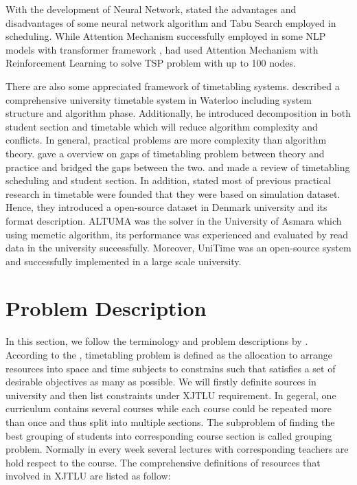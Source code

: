 \documentclass{article}
\begin{document}
With the development of Neural Network, \cite{(fazelzarandi2020)state} stated the advantages and disadvantages of some neural network algorithm and Tabu Search employed in scheduling. While Attention Mechanism successfully employed in some NLP models with transformer framework \citep{(ashishvaswani2017)attention,(devlin2019)bert}, \cite{(kool2019)attention} had used Attention Mechanism with Reinforcement Learning to solve TSP problem with up to 100 nodes.

There are also some appreciated framework of timetabling systems. \cite{(carter2000)comprehensive} described a comprehensive university timetable system in Waterloo including system structure and algorithm phase. Additionally, he introduced decomposition in both student section and timetable which will reduce algorithm complexity and conflicts. In general, practical problems are more complexity than algorithm theory. \cite{(mccollum2006)perspective} gave a overview on gaps of timetabling problem between theory and practice and bridged the gaps between the two.  \cite{(kristiansen2013)comprehensive} and \cite{(johnes2015)operational} made a review of timetabling scheduling and student section. In addition, \cite{(kristiansen2013)comprehensive} stated most of previous practical research in timetable were founded that they were based on simulation dataset. Hence, they introduced a open-source dataset in Denmark university and its format description. ALTUMA \citep{(tesfaldet2008)automated} was the solver in the University of Asmara which using memetic algorithm, its performance was experienced and evaluated by read data in the university successfully. Moreover, UniTime \citep{(muller2016)reallife} was an open-source system and successfully implemented in a large scale university.


\newpage

\section{Problem Description}
\label{sec: Problem Description}

In this section, we follow the terminology and problem descriptions by \cite{(werra1985)introduction}. According to the \cite{(wren1996)scheduling}, timetabling problem is defined as the allocation to arrange resources into space and time subjects to constrains such that satisfies a set of desirable objectives as many as possible. We will firstly definite sources in university and then list constraints under XJTLU requirement. In gegeral, one curriculum contains several courses while each course could be repeated more than once and thus split into multiple sections. The subproblem of finding the best grouping of students into corresponding course section is called grouping problem. Normally in every week several lectures with corresponding teachers are hold respect to the course. The comprehensive definitions of resources that involved in XJTLU are listed as follow:
\end{document}
